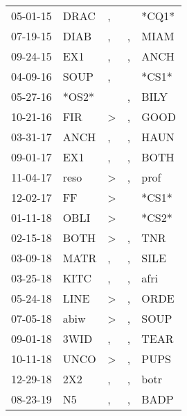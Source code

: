 \begin{supertabular}{lllll}
 05-01-15 &   DRAC &             , &    &  *CQ1* \\
 07-19-15 &   DIAB &             , &  , &   MIAM \\
 09-24-15 &    EX1 &             , &  , &   ANCH \\
 04-09-16 &   SOUP &             , &    &  *CS1* \\
 05-27-16 &  *OS2* &               &  , &   BILY \\
 10-21-16 &    FIR &  \textgreater &  , &   GOOD \\
 03-31-17 &   ANCH &             , &  , &   HAUN \\
 09-01-17 &    EX1 &             , &  , &   BOTH \\
 11-04-17 &   reso &  \textgreater &  , &   prof \\
 12-02-17 &     FF &  \textgreater &    &  *CS1* \\
 01-11-18 &   OBLI &  \textgreater &    &  *CS2* \\
 02-15-18 &   BOTH &  \textgreater &  , &    TNR \\
 03-09-18 &   MATR &             , &  , &   SILE \\
 03-25-18 &   KITC &             , &  , &   afri \\
 05-24-18 &   LINE &  \textgreater &  , &   ORDE \\
 07-05-18 &   abiw &  \textgreater &  , &   SOUP \\
 09-01-18 &   3WID &             , &  , &   TEAR \\
 10-11-18 &   UNCO &  \textgreater &  , &   PUPS \\
 12-29-18 &    2X2 &             , &  , &   botr \\
 08-23-19 &     N5 &             , &  , &   BADP \\
\end{supertabular}
